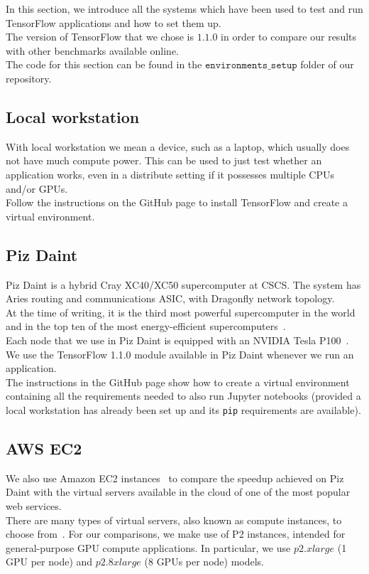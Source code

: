 In this section, we introduce all the systems which have been used to test and run TensorFlow applications and how to set them up.\\
The version of TensorFlow that we chose is $1.1.0$ in order to compare our results with other benchmarks available online.\\

The code for this section can be found in the $\texttt{environments\_setup}$ folder of our repository.

\subsection{Local workstation}
With local workstation we mean a device, such as a laptop, which usually does not have much compute power.
This can be used to just test whether an application works, even in a distribute setting if it possesses multiple CPUs and/or GPUs.\\

Follow the instructions on the GitHub page to install TensorFlow and create a virtual environment.

\subsection{Piz Daint}
Piz Daint is a hybrid Cray XC40/XC50 supercomputer at CSCS.
The system has Aries routing and communications ASIC, with Dragonfly network topology.\\
At the time of writing, it is the third most powerful supercomputer in the world~\cite{top500} and in the top ten of the most energy-efficient supercomputers~\cite{green500}.\\
Each node that we use in Piz Daint is equipped with an NVIDIA Tesla P100~\cite{p100}.\\

We use the TensorFlow 1.1.0 module available in Piz Daint whenever we run an application.\\
The instructions in the GitHub page show how to create a virtual environment containing all the requirements needed to also run Jupyter notebooks (provided a local workstation has already been set up and its \texttt{pip} requirements are available).

\subsection{AWS EC2}
We also use Amazon EC2 instances~\cite{ec2} to compare the speedup achieved on Piz Daint with the virtual servers available in the cloud of one of the most popular web services.\\
There are many types of virtual servers, also known as compute instances, to choose from~\cite{ec2instances}.
For our comparisons, we make use of P2 instances, intended for general-purpose GPU compute applications.
In particular, we use $p2.xlarge$ (1 GPU per node) and $p2.8xlarge$ (8 GPUs per node) models.\\

